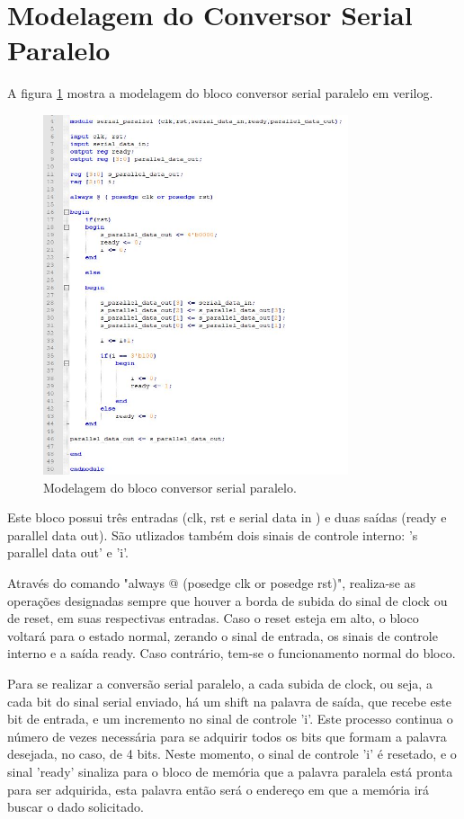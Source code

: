 \section{Modelagem do Conversor Serial Paralelo}

A figura \ref{verilogsp} mostra a modelagem do bloco conversor serial paralelo em verilog.

\begin{figure}[ht!]
  \centering
  \includegraphics[width=0.8\textwidth]{figuras/verilogSP.JPG}
  \caption{Modelagem do bloco conversor serial paralelo.}
  \label{verilogsp}
\end{figure}

Este bloco possui três entradas (clk, rst e serial data in ) e duas saídas (ready e parallel data out). São utlizados também dois sinais de controle interno: 's parallel data out' e 'i'.

Através do comando "always @ (posedge clk or posedge rst)", realiza-se as operações designadas sempre que houver a borda de subida do sinal de clock ou de reset, em suas respectivas entradas. Caso o reset esteja em alto, o bloco voltará para o estado normal, zerando o sinal de entrada, os sinais de controle interno e a saída ready. Caso contrário, tem-se o funcionamento normal do bloco. 

Para se realizar a conversão serial paralelo, a cada subida de clock, ou seja, a cada bit do sinal serial enviado, há um shift na palavra de saída, que recebe este bit de entrada, e um incremento no sinal de controle 'i'. Este processo continua o número de vezes necessária para se adquirir todos os bits que formam a palavra desejada, no caso, de 4 bits. Neste momento, o sinal de controle 'i' é resetado, e o sinal 'ready' sinaliza para o bloco de memória que a palavra paralela está pronta para ser adquirida, esta palavra então será o endereço em que a memória irá buscar o dado solicitado.

